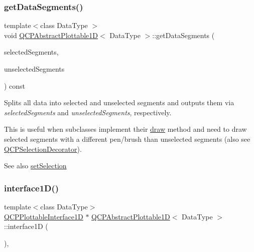 \subsubsection{\texorpdfstring{getDataSegments()}{getDataSegments()}}
{\footnotesize\ttfamily template$<$class Data\+Type $>$ \\
void \mbox{\hyperlink{class_q_c_p_abstract_plottable1_d}{Q\+C\+P\+Abstract\+Plottable1D}}$<$ Data\+Type $>$\+::get\+Data\+Segments (\begin{DoxyParamCaption}\item[{Q\+List$<$ \mbox{\hyperlink{class_q_c_p_data_range}{Q\+C\+P\+Data\+Range}} $>$ \&}]{selected\+Segments,  }\item[{Q\+List$<$ \mbox{\hyperlink{class_q_c_p_data_range}{Q\+C\+P\+Data\+Range}} $>$ \&}]{unselected\+Segments }\end{DoxyParamCaption}) const\hspace{0.3cm}{\ttfamily [protected]}}

Splits all data into selected and unselected segments and outputs them via {\itshape selected\+Segments} and {\itshape unselected\+Segments}, respectively.

This is useful when subclasses implement their \mbox{\hyperlink{class_q_c_p_abstract_plottable_a453f676a5cee7bf846c5f0fa05ea84b3}{draw}} method and need to draw selected segments with a different pen/brush than unselected segments (also see \mbox{\hyperlink{class_q_c_p_selection_decorator}{Q\+C\+P\+Selection\+Decorator}}).

\begin{DoxySeeAlso}{See also}
\mbox{\hyperlink{class_q_c_p_abstract_plottable_a219bc5403a9d85d3129165ec3f5ae436}{set\+Selection}} 
\end{DoxySeeAlso}
\mbox{\label{class_q_c_p_abstract_plottable1_d_ac58fb47bfe330f6931ed8e64326387d7}} 
\subsubsection{\texorpdfstring{interface1D()}{interface1D()}}
{\footnotesize\ttfamily template$<$class Data\+Type$>$ \\
\mbox{\hyperlink{class_q_c_p_plottable_interface1_d}{Q\+C\+P\+Plottable\+Interface1D}} $\ast$ \mbox{\hyperlink{class_q_c_p_abstract_plottable1_d}{Q\+C\+P\+Abstract\+Plottable1D}}$<$ Data\+Type $>$\+::interface1D (\begin{DoxyParamCaption}{ }\end{DoxyParamCaption})\hspace{0.3cm}{\ttfamily [inline]}, {\ttfamily [virtual]}}


